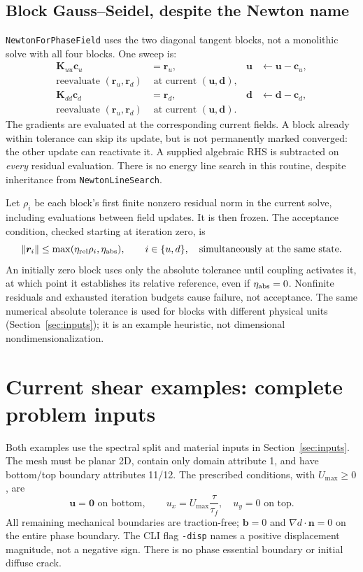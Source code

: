 \documentclass[11pt,a4paper]{article}
\newcommand{\uu}{\bm{u}}
\newcommand{\code}[1]{\texttt{\small #1}}
\newcommand{\sectionpage}[1]{\clearpage\section{#1}}
\numberwithin{equation}{section}
\begin{document}
\subsection{Block Gauss--Seidel, despite the Newton name}
\code{NewtonForPhaseField} uses the two diagonal tangent blocks, not a
monolithic solve with all four blocks. One sweep is:
\begin{align}
 \bm K_{uu}\bm c_u&=\bm r_u, &\bm u&\leftarrow\bm u-\bm c_u,\\
 \text{reevaluate }(\bm r_u,\bm r_d)&\text{ at current }(\bm u,\bm d),&&\\
 \bm K_{dd}\bm c_d&=\bm r_d, &\bm d&\leftarrow\bm d-\bm c_d,\\
 \text{reevaluate }(\bm r_u,\bm r_d)&\text{ at current }(\bm u,\bm d).&&
\end{align}
The gradients are evaluated at the corresponding current fields. A block
already within tolerance can skip its update, but is not permanently marked
converged: the other update can reactivate it. A supplied algebraic RHS is
subtracted on \emph{every} residual evaluation. There is no energy line search
in this routine, despite inheritance from \code{NewtonLineSearch}.

Let $\rho_i$ be each block's first finite nonzero residual norm in the current
solve, including evaluations between field updates. It is then frozen. The
acceptance condition, checked starting at iteration zero, is
\begin{equation}
 \|\bm r_i\|\le\max(\eta_{\rm rel}\rho_i,\eta_{\rm abs}),
 \qquad i\in\{u,d\},\quad\text{simultaneously at the same state}.\label{eq:tol}
\end{equation}
An initially zero block uses only the absolute tolerance until coupling
activates it, at which point it establishes its relative reference, even if
$\eta_{\rm abs}=0$. Nonfinite residuals and exhausted iteration budgets cause
failure, not acceptance. The same numerical absolute tolerance is used for
blocks with different physical units (Section~\ref{sec:inputs}); it is an
example heuristic, not dimensional nondimensionalization.

\sectionpage{Current shear examples: complete problem inputs}
\label{sec:examples}
Both examples use the spectral split and material inputs in
Section~\ref{sec:inputs}. The mesh must be planar 2D, contain only domain
attribute 1, and have bottom/top boundary attributes 11/12. The prescribed
conditions, with $U_{\max}\ge0$, are
\begin{equation}
 \uu=\bm0\text{ on bottom},\qquad
 u_x=U_{\max}\frac{\tau}{\tau_f},\quad u_y=0\text{ on top}.
\end{equation}
All remaining mechanical boundaries are traction-free; $\bm b=0$ and
$\nabla d\cdot\bm n=0$ on the entire phase boundary. The CLI flag
\code{-disp} names a positive displacement magnitude, not a negative sign.
There is no phase essential boundary or initial diffuse crack.
\end{document}
